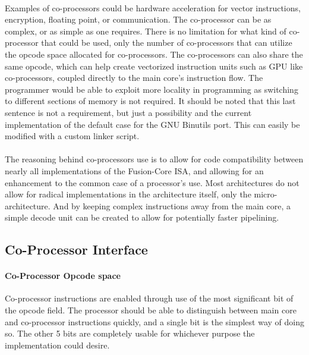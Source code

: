 \documentclass[letterpaper, 11pt]{article}
\begin{document}
\paragraph{} Examples of co-processors could be hardware acceleration for vector instructions, encryption, floating point, or communication.
The co-processor can be as complex, or as simple as one requires. There is no limitation for what kind of co-processor that could be used, 
only the number of co-processors that can utilize the opcode space allocated for co-processors. The co-processors can also share the same opcode, which
can help create vectorized instruction units such as GPU like co-processors, coupled directly to the main core's instruction flow. The programmer would
be able to exploit more locality in programming as switching to different sections of memory is not required. It should be noted that this last sentence is
not a requirement, but just a possibility and the current implementation of the default case for the GNU Binutils port. This can easily be modified with a 
custom linker script.

\paragraph{} The reasoning behind co-processors use is to allow for code compatibility between nearly all implementations of the Fusion-Core ISA, and
allowing for an enhancement to the common case of a processor's use. Most architectures do not allow for radical implementations in the architecture itself,
only the micro-architecture. And by keeping complex instructions away from the main core, a simple decode unit can be created to allow for potentially faster
pipelining. 

\subsection{ Co-Processor Interface}

\paragraph{ Co-Processor Opcode space} Co-processor instructions are enabled through use of the most significant bit of the opcode field. 
The processor should be able to distinguish between main core and co-processor instructions quickly, and a single bit is the simplest way of doing so.
The other 5 bits are completely usable for whichever purpose the implementation could desire.
\end{document}
